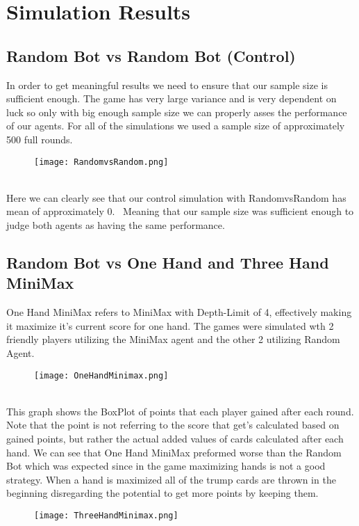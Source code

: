 \section{Simulation Results}\label{Simulation Results}\thispagestyle{SectionFirstPage} %
\subsection{Random Bot vs Random Bot (Control)}
In order to get meaningful results we need to ensure that our sample size is sufficient enough. 
The game has very large variance and is very dependent on luck so only with big enough sample size we can properly asses the performance of our agents.
For all of the simulations we used a sample size of approximately 500 full rounds. 
\begin{figure}[h]
    \centering
    \texttt{[image: RandomvsRandom.png]}
\end{figure}\\
Here we can clearly see that our control simulation with RandomvsRandom has mean of approximately 0. \
Meaning that our sample size was sufficient enough to judge both agents as having the same performance.
\pagebreak
\subsection{Random Bot vs One Hand and Three Hand MiniMax}
One Hand MiniMax refers to MiniMax with Depth-Limit of 4, effectively making it maximize it's current score for one hand. 
The games were simulated wth 2 friendly players utilizing the MiniMax agent and the other 2 utilizing Random Agent.
\begin{figure}[h]
    \centering
    \texttt{[image: OneHandMinimax.png]}
\end{figure}\\
This graph shows the BoxPlot of points that each player gained after each round. 
Note that the point is not referring to the score that get's calculated based on gained points, but rather the actual added values of cards calculated after each hand.
We can see that One Hand MiniMax preformed worse than the Random Bot which was expected since in the game maximizing hands is not a good strategy. 
When a hand is maximized all of the trump cards are thrown in the beginning disregarding the potential to get more points by keeping them. 
\begin{figure}[h]
    \centering
    \texttt{[image: ThreeHandMinimax.png]}
\end{figure}\\
\pagebreak


